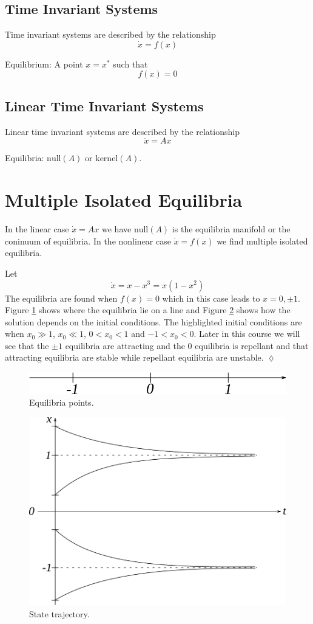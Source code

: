 \subsection{Time Invariant Systems}
Time invariant systems are described by the relationship
$$\dot{x}=f(x)$$
\begin{definition}
Equilibrium: A point $x=x^\ast$ such that
$$f(x) = 0$$
\end{definition}

\subsection{Linear Time Invariant Systems}
Linear time invariant systems are described by the relationship
$$\dot{x}=Ax$$
\begin{definition}
Equilibria: $\text{null}(A)$ or $\text{kernel}(A)$.
\end{definition}

\section{Multiple Isolated Equilibria}
In the linear case $\dot{x}=Ax$ we have $\text{null}(A)$ is the equilibria manifold or the coninuum of equilibria. In the nonlinear case $\dot{x}=f(x)$ we find multiple isolated equilibria.
\begin{example}
Let
$$\dot{x} = x-x^3 = x(1-x^2)$$
The equilibria are found when $f(x)=0$ which in this case leads to $x=0,\pm1$. Figure \ref{fig:01roots} shows where the equilibria lie on a line and Figure \ref{fig:01traj} shows how the solution depends on the initial conditions. The highlighted initial conditions are when $x_0\gg1$, $x_0\ll1$, $0<x_0<1$ and $-1<x_0<0$. Later in this course we will see that the $\pm1$ equilibria are attracting and the $0$ equilibria is repellant and that attracting equilibria are stable while repellant equilibria are unstable.
$\lozenge$
\end{example}

\begin{figure}[ht!]
	\centering
	\includegraphics[width=.4\textwidth]{images/01roots}
	\caption{Equilibria points.}
	\label{fig:01roots}
\end{figure}

\begin{figure}[ht!]
	\centering
	\includegraphics[width=.4\textwidth]{images/01traj}
	\caption{State trajectory.}
	\label{fig:01traj}
\end{figure}

